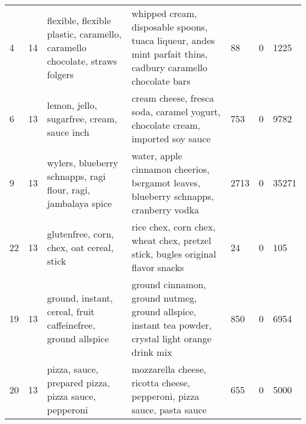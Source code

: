 \begin{tabular}{lllllll}
4 & 14 & flexible, flexible plastic, caramello, caramello chocolate, straws folgers & whipped cream, disposable spoons, tuaca liqueur, andes mint parfait thins, cadbury caramello chocolate bars & 88 & 0 & 1225 \\
6 & 13 & lemon, jello, sugarfree, cream, sauce inch & cream cheese, fresca soda, caramel yogurt, chocolate cream, imported soy sauce & 753 & 0 & 9782 \\
9 & 13 & wylers, blueberry schnapps, ragi flour, ragi, jambalaya spice & water, apple cinnamon cheerios, bergamot leaves, blueberry schnapps, cranberry vodka & 2713 & 0 & 35271 \\
22 & 13 & glutenfree, corn, chex, oat cereal, stick & rice chex, corn chex, wheat chex, pretzel stick, bugles original flavor snacks & 24 & 0 & 105 \\
19 & 13 & ground, instant, cereal, fruit caffeinefree, ground allspice & ground cinnamon, ground nutmeg, ground allspice, instant tea powder, crystal light orange drink mix & 850 & 0 & 6954 \\
20 & 13 & pizza, sauce, prepared pizza, pizza sauce, pepperoni & mozzarella cheese, ricotta cheese, pepperoni, pizza sauce, pasta sauce & 655 & 0 & 5000 \\
\bottomrule
\end{tabular}
